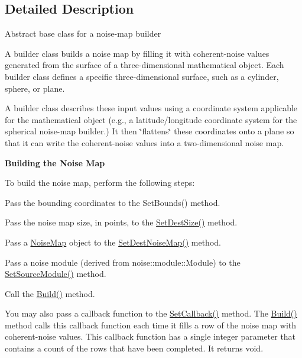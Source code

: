 \subsection{Detailed Description}
Abstract base class for a noise-\/map builder

A builder class builds a noise map by filling it with coherent-\/noise values generated from the surface of a three-\/dimensional mathematical object. Each builder class defines a specific three-\/dimensional surface, such as a cylinder, sphere, or plane.

A builder class describes these input values using a coordinate system applicable for the mathematical object (e.\+g., a latitude/longitude coordinate system for the spherical noise-\/map builder.) It then \char`\"{}flattens\char`\"{} these coordinates onto a plane so that it can write the coherent-\/noise values into a two-\/dimensional noise map.

{\bfseries Building the Noise Map}

To build the noise map, perform the following steps\+:
\begin{DoxyItemize}
\item Pass the bounding coordinates to the Set\+Bounds() method.
\item Pass the noise map size, in points, to the \hyperlink{classnoise_1_1utils_1_1_noise_map_builder_abad282f0cbe67824b73c580f611a7bd0}{Set\+Dest\+Size()} method.
\item Pass a \hyperlink{classnoise_1_1utils_1_1_noise_map}{Noise\+Map} object to the \hyperlink{classnoise_1_1utils_1_1_noise_map_builder_a07555b64324efbb16f0ef244c4fed8b7}{Set\+Dest\+Noise\+Map()} method.
\item Pass a noise module (derived from noise\+::module\+::\+Module) to the \hyperlink{classnoise_1_1utils_1_1_noise_map_builder_aa39e8ea292711aa3a7627ddcaee4f12f}{Set\+Source\+Module()} method.
\item Call the \hyperlink{classnoise_1_1utils_1_1_noise_map_builder_abe0e5f01c696c2290792c8f8736e3ed1}{Build()} method.
\end{DoxyItemize}

You may also pass a callback function to the \hyperlink{classnoise_1_1utils_1_1_noise_map_builder_ac760187423eb5e16ac015f9beafd78ea}{Set\+Callback()} method. The \hyperlink{classnoise_1_1utils_1_1_noise_map_builder_abe0e5f01c696c2290792c8f8736e3ed1}{Build()} method calls this callback function each time it fills a row of the noise map with coherent-\/noise values. This callback function has a single integer parameter that contains a count of the rows that have been completed. It returns void.

